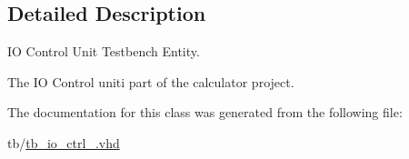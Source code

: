 \subsection{Detailed Description}
IO Control Unit Testbench Entity. 

The IO Control uniti part of the calculator project. 

The documentation for this class was generated from the following file\+:\begin{DoxyCompactItemize}
\item 
tb/\hyperlink{tb__io__ctrl___8vhd}{tb\+\_\+io\+\_\+ctrl\+\_\+.\+vhd}\end{DoxyCompactItemize}
